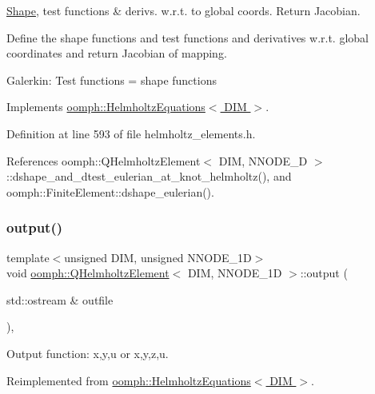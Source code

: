 \hyperlink{classoomph_1_1Shape}{Shape}, test functions \& derivs. w.\+r.\+t. to global coords. Return Jacobian. 

Define the shape functions and test functions and derivatives w.\+r.\+t. global coordinates and return Jacobian of mapping.

Galerkin\+: Test functions = shape functions 

Implements \hyperlink{classoomph_1_1HelmholtzEquations_a9a64bff0cb0c873e50eba0f39ace79f1}{oomph\+::\+Helmholtz\+Equations$<$ D\+I\+M $>$}.



Definition at line 593 of file helmholtz\+\_\+elements.\+h.



References oomph\+::\+Q\+Helmholtz\+Element$<$ D\+I\+M, N\+N\+O\+D\+E\+\_\+D $>$\+::dshape\+\_\+and\+\_\+dtest\+\_\+eulerian\+\_\+at\+\_\+knot\+\_\+helmholtz(), and oomph\+::\+Finite\+Element\+::dshape\+\_\+eulerian().

\mbox{\label{classoomph_1_1QHelmholtzElement_ab64bdf668cacf69003ddc36832b29559}} 
\subsubsection{\texorpdfstring{output()}{output()}\hspace{0.1cm}{\footnotesize\ttfamily [1/4]}}
{\footnotesize\ttfamily template$<$unsigned D\+IM, unsigned N\+N\+O\+D\+E\+\_\+1D$>$ \\
void \hyperlink{classoomph_1_1QHelmholtzElement}{oomph\+::\+Q\+Helmholtz\+Element}$<$ D\+IM, N\+N\+O\+D\+E\+\_\+1D $>$\+::output (\begin{DoxyParamCaption}\item[{std\+::ostream \&}]{outfile }\end{DoxyParamCaption})\hspace{0.3cm}{\ttfamily [inline]}, {\ttfamily [virtual]}}



Output function\+: x,y,u or x,y,z,u. 



Reimplemented from \hyperlink{classoomph_1_1HelmholtzEquations_ad06140cef8a602246cf45f1b38d201e3}{oomph\+::\+Helmholtz\+Equations$<$ D\+I\+M $>$}.



